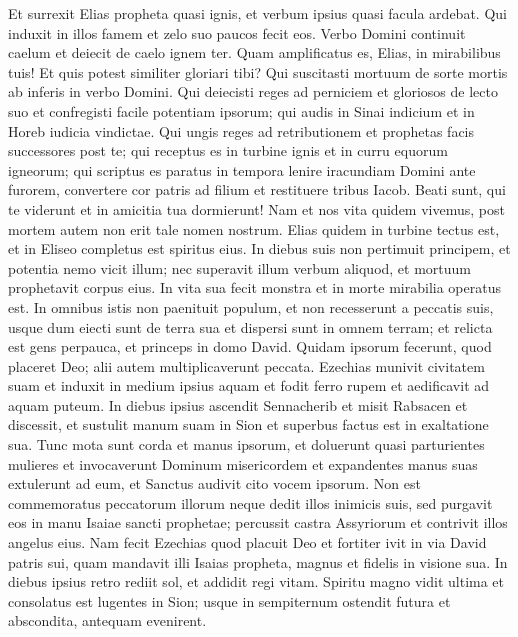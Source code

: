\begin{biblechapter}  
\verse Et surrexit Elias propheta quasi ignis, et verbum ipsius quasi facula ardebat. 
\verse Qui induxit in illos famem et zelo suo paucos fecit eos. 
\verse Verbo Domini continuit caelum et deiecit de caelo ignem ter. 
\verse Quam amplificatus es, Elias, in mirabilibus tuis! Et quis potest similiter gloriari tibi? 
\verse Qui suscitasti mortuum de sorte mortis ab inferis in verbo Domini. 
\verse Qui deiecisti reges ad perniciem et gloriosos de lecto suo et confregisti facile potentiam ipsorum; 
\verse qui audis in Sinai indicium et in Horeb iudicia vindictae. 
\verse Qui ungis reges ad retributionem et prophetas facis successores post te; 
\verse qui receptus es in turbine ignis et in curru equorum igneorum; 
\verse qui scriptus es paratus in tempora lenire iracundiam Domini ante furorem, convertere cor patris ad filium et restituere tribus Iacob. 
\verse Beati sunt, qui te viderunt et in amicitia tua dormierunt! 
\verse Nam et nos vita quidem vivemus, post mortem autem non erit tale nomen nostrum. 
\verse Elias quidem in turbine tectus est, et in Eliseo completus est spiritus eius. In diebus suis non pertimuit principem, et potentia nemo vicit illum; 
\verse nec superavit illum verbum aliquod, et mortuum prophetavit corpus eius. 
\verse In vita sua fecit monstra et in morte mirabilia operatus est. 
\verse In omnibus istis non paenituit populum, et non recesserunt a peccatis suis, usque dum eiecti sunt de terra sua et dispersi sunt in omnem terram; 
\verse et relicta est gens perpauca, et princeps in domo David. 
\verse Quidam ipsorum fecerunt, quod placeret Deo; alii autem multiplicaverunt peccata. 
\verse Ezechias munivit civitatem suam et induxit in medium ipsius aquam et fodit ferro rupem et aedificavit ad aquam puteum. 
\verse In diebus ipsius ascendit Sennacherib et misit Rabsacen et discessit, et sustulit manum suam in Sion et superbus factus est in exaltatione sua. 
\verse Tunc mota sunt corda et manus ipsorum, et doluerunt quasi parturientes mulieres 
\verse et invocaverunt Dominum misericordem et expandentes manus suas extulerunt ad eum, et Sanctus audivit cito vocem ipsorum. 
\verse Non est commemoratus peccatorum illorum neque dedit illos inimicis suis, sed purgavit eos in manu Isaiae sancti prophetae; 
\verse percussit castra Assyriorum et contrivit illos angelus eius. 
\verse Nam fecit Ezechias quod placuit Deo et fortiter ivit in via David patris sui, quam mandavit illi Isaias propheta, magnus et fidelis in visione sua. 
\verse In diebus ipsius retro rediit sol, et addidit regi vitam. 
\verse Spiritu magno vidit ultima et consolatus est lugentes in Sion; usque in sempiternum ostendit futura 
\verse et abscondita, antequam evenirent. 
\end{biblechapter}

